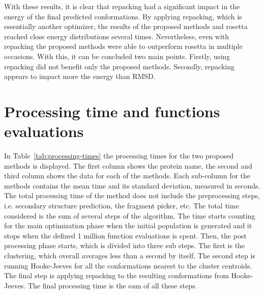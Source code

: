 With these results, it is clear that repacking had a significant impact in the
energy of the final predicted conformations. By applying repacking, which is
essentially another optimizer, the results of the proposed methods and rosetta
reached close energy distributions several times. Nevertheless, even with
repacking the proposed methods were able to outperform rosetta in multiple
occasions. With this, it can be concluded two main points. Firstly, using
repacking did not benefit only the proposed methods. Secondly, repacking
appears to impact more the energy than RMSD.

\section{Processing time and functions evaluations} \label{sec:time-and-evals}

In Table~\ref{tab:processing-times} the processing times for the two proposed
methods is displayed. The first column shows the protein name, the second and
third column shows the data for each of the methods. Each sub-column for the
methods contains the mean time and its standard deviation, measured in seconds.
The total processing time of the method does not include the preprocessing
steps, i.e. secondary structure prediction, the fragment picker, etc. The total
time considered is the sum of several steps of the algorithm. The time starts
counting for the main optimization phase when the initial population is
generated and it stops when the defined 1 million function evaluations is
spent. Then, the post processing phase starts, which is divided into three
sub steps. The first is the clustering, which overall averages less than a
second by itself. The second step is running Hooke-Jeeves for all the
conformations nearest to the cluster centroids. The final step is applying
repacking to the resulting conformations from Hooke-Jeeves. The final
processing time is the sum of all these steps.

